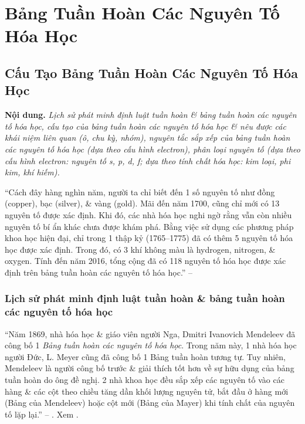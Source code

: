 \documentclass[oneside]{book}
\numberwithin{equation}{section}
\begin{document}

\chapter{Bảng Tuần Hoàn Các Nguyên Tố Hóa Học}

\section{Cấu Tạo Bảng Tuần Hoàn Các Nguyên Tố Hóa Học}
\textbf{Nội dung.} \textit{Lịch sử phát minh định luật tuần hoàn \& bảng tuần hoàn các nguyên tố hóa học, cấu tạo của bảng tuần hoàn các nguyên tố hóa học \& nêu được các khái niệm liên quan (ô, chu kỳ, nhóm), nguyên tắc sắp xếp của bảng tuần hoàn các nguyên tố hóa học (dựa theo cấu hình electron), phân loại nguyên tố (dựa theo cấu hình electron: nguyên tố s, p, d, f; dựa theo tính chất hóa học: kim loại, phi kim, khí hiếm).}

``Cách đây hàng nghìn năm, người ta chỉ biết đến 1 số nguyên tố như đồng (copper), bạc (silver), \& vàng (gold). Mãi đến năm 1700, cũng chỉ mới có 13 nguyên tố được xác định. Khi đó, các nhà hóa học nghi ngờ rằng vẫn còn nhiều nguyên tố bí ẩn khác chưa được khám phá. Bằng việc sử dụng các phương pháp khoa học hiện đại, chỉ trong 1 thập kỷ (1765--1775) đã có thêm 5 nguyên tố hóa học được xác định. Trong đó, có 3 khí không màu là hydrogen, nitrogen, \& oxygen. Tính đến năm 2016, tổng cộng đã có 118 nguyên tố hóa học được xác định trên bảng tuần hoàn các nguyên tố hóa học.'' -- \cite[p. 33]{SGK_Hoa_Hoc_10_Chan_Troi_Sang_Tao}

\subsection{Lịch sử phát minh định luật tuần hoàn \& bảng tuần hoàn các nguyên tố hóa học}
``Năm 1869, nhà hóa học \& giáo viên người Nga, Dmitri Ivanovich Mendeleev đã công bố 1 \textit{Bảng tuần hoàn các nguyên tố hóa học}. Trong năm này, 1 nhà hóa học người Đức, L. Meyer cũng đã công bố 1 Bảng tuần hoàn tương tự. Tuy nhiên, Mendeleev là người công bố trước \& giải thích tốt hơn về sự hữu dụng của bảng tuần hoàn do ông đề nghị. 2 nhà khoa học đều sắp xếp các nguyên tố vào các hàng \& các cột theo chiều tăng dần khối lượng nguyên tử, bắt đầu ở hàng mới (Bảng của Mendeleev) hoặc cột mới (Bảng của Mayer) khi tính chất của nguyên tố lặp lại.'' -- \cite[pp. 33--34]{SGK_Hoa_Hoc_10_Chan_Troi_Sang_Tao}. Xem \cite[Hình 5.1: \textsf{Bảng tuần hoàn các nguyên tố hóa học của Mendeleev (1869)}, p. 34]{SGK_Hoa_Hoc_10_Chan_Troi_Sang_Tao}.
\end{document}
